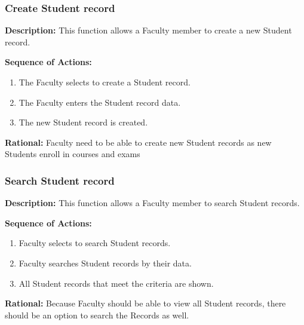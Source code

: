    \subsubsection{\large Create Student record} 
   \begin{boxed} %
      \textbf{Description:}
      This function allows a Faculty member to create a new Student
         record. 
         
         \vspace{3mm}
         \textbf{Sequence of Actions:}
         \begin{enumerate}
               
            \item The Faculty selects to create a Student record.
            \item The Faculty enters the Student record data.
            \item The new Student record is created.
      \end{enumerate}

         \textbf{Rational:}
         Faculty need to be able to create new Student records as new Students
         enroll in courses and exams
   \end{boxed} %

   \subsubsection{\large Search Student record} 
   \begin{boxed} %
      \textbf{Description:}
      This function allows a Faculty member to search Student records.
         
      \vspace{3mm}
         \textbf{Sequence of Actions:}
         \begin{enumerate}
               
            \item Faculty selects to search Student records.
            \item Faculty searches Student records by their data.
            \item All Student records that meet the criteria are shown.
      \end{enumerate}

         \textbf{Rational:}
         Because Faculty should be able to view all Student records, there
         should be an option to search the Records as well.
   \end{boxed} %

